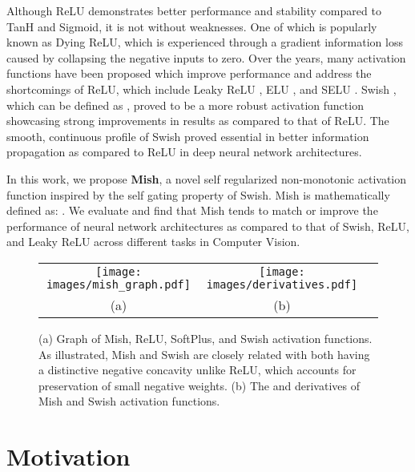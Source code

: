 \documentclass{bmvc2k}
\begin{document}
Although ReLU demonstrates better performance and stability compared to TanH and Sigmoid, it is not without weaknesses. One of which is popularly known as Dying ReLU, which is experienced through a gradient information loss caused by collapsing the negative inputs to zero. Over the years, many activation functions have been proposed which improve performance and address the shortcomings of ReLU, which include Leaky ReLU \cite{maas2013rectifier}, ELU \cite{clevert2015fast}, and SELU \cite{klambauer2017self}. Swish \cite{ramachandran2017searching}, which can be defined as , proved to be a more robust activation function showcasing strong improvements in results as compared to that of ReLU. The smooth, continuous profile of Swish proved essential in better information propagation as compared to ReLU in deep neural network architectures. 

In this work, we propose \textbf{Mish}, a novel self regularized non-monotonic activation function inspired by the self gating property of Swish. Mish is mathematically defined as: . We evaluate and find that Mish tends to match or improve the performance of neural network architectures as compared to that of Swish, ReLU, and Leaky ReLU across different tasks in Computer Vision.

\begin{figure}
	\centering
	\begin{tabular}{ccc}
	\texttt{[image: images/mish\_graph.pdf]}&
	\texttt{[image: images/derivatives.pdf]}\\
	(a)&(b)
	\end{tabular}
\caption{(a) Graph of Mish, ReLU, SoftPlus, and Swish activation functions. As illustrated, Mish and Swish are closely related with both having a distinctive negative concavity unlike ReLU, which accounts for preservation of small negative weights. (b) The  and  derivatives of Mish and Swish activation functions.}
\label{fig:Mish}
\end{figure}

\section{Motivation}
\label{sec:motivation}
\end{document}
